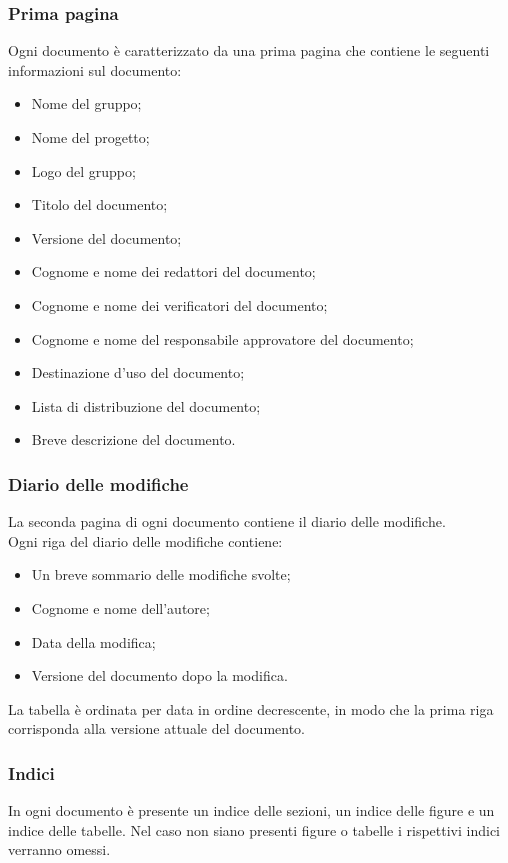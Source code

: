       \subsubsection{Prima pagina}
        Ogni documento è caratterizzato da una prima pagina che contiene le seguenti informazioni sul documento:\\
        \begin{itemize}
          \item Nome del gruppo;
          \item Nome del progetto;
          \item Logo del gruppo;
          \item Titolo del documento;
          \item Versione del documento;
          \item Cognome e nome dei redattori del documento;
          \item Cognome e nome dei verificatori del documento;
          \item Cognome e nome del responsabile approvatore del documento;
          \item Destinazione d’uso del documento;
          \item Lista di distribuzione del documento;
          \item Breve descrizione del documento.
        \end{itemize}
      \subsubsection{Diario delle modifiche}
        La seconda pagina di ogni documento contiene il diario delle modifiche.\\
        Ogni riga del diario delle modifiche contiene:
        \begin{itemize}
          \item Un breve sommario delle modifiche svolte;
          \item Cognome e nome dell’autore;
          \item Data della modifica;
          \item Versione del documento dopo la modifica.
        \end{itemize}
        La tabella è ordinata per data in ordine decrescente, in modo che la prima riga corrisponda alla versione attuale del documento.
      \subsubsection{Indici}
        In ogni documento è presente un indice delle sezioni, un indice delle figure e un indice delle tabelle. Nel caso non siano presenti figure o tabelle i rispettivi indici verranno omessi.
